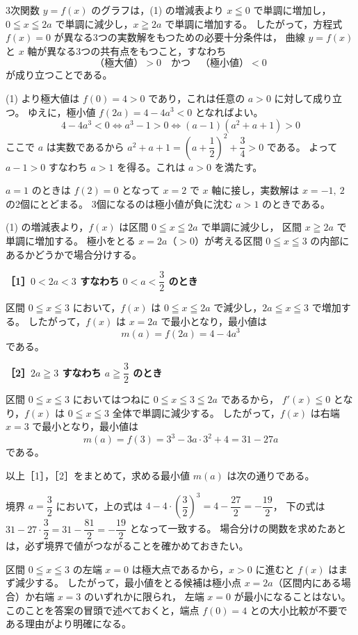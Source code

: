 3次関数 $y=f(x)$ のグラフは，(1) の増減表より $x\leqq0$ で単調に増加し，
$0\leqq x\leqq2a$ で単調に減少し，$x\geqq2a$ で単調に増加する。
したがって，方程式 $f(x)=0$ が異なる3つの実数解をもつための必要十分条件は，
曲線 $y=f(x)$ と $x$ 軸が異なる3つの共有点をもつこと，すなわち
\[
  \text{（極大値）}>0\quad\text{かつ}\quad\text{（極小値）}<0
\]
が成り立つことである。

(1) より極大値は $f(0)=4>0$ であり，これは任意の $a>0$ に対して成り立つ。
ゆえに，極小値 $f(2a)=4-4a^{3}<0$ となればよい。
\[
  4-4a^{3}<0 \iff a^{3}-1>0 \iff (a-1)(a^{2}+a+1)>0
\]
ここで $a$ は実数であるから $a^{2}+a+1=\left(a+\dfrac{1}{2}\right)^{2}+\dfrac{3}{4}>0$ である。
よって $a-1>0$ すなわち $a>1$ を得る。これは $a>0$ を満たす。


$a=1$ のときは $f(2)=0$ となって $x=2$ で $x$ 軸に接し，実数解は $x=-1,\ 2$ の2個にとどまる。
3個になるのは極小値が負に沈む $a>1$ のときである。

(1) の増減表より，$f(x)$ は区間 $0\leqq x\leqq2a$ で単調に減少し，
区間 $x\geqq2a$ で単調に増加する。
極小をとる $x=2a$（$>0$）が考える区間 $0\leqq x\leqq3$ の内部にあるかどうかで場合分けする。

\medskip
\noindent\textbf{［1］$0<2a<3$ すなわち $0<a<\dfrac{3}{2}$ のとき}

区間 $0\leqq x\leqq3$ において，$f(x)$ は $0\leqq x\leqq2a$ で減少し，$2a\leqq x\leqq3$ で増加する。
したがって，$f(x)$ は $x=2a$ で最小となり，最小値は
\[
  m(a)=f(2a)=4-4a^{3}
\]
である。

\medskip
\noindent\textbf{［2］$2a\geqq3$ すなわち $a\geqq\dfrac{3}{2}$ のとき}

区間 $0\leqq x\leqq3$ においてはつねに $0\leqq x\leqq3\leqq2a$ であるから，
$f'(x)\leqq0$ となり，$f(x)$ は $0\leqq x\leqq3$ 全体で単調に減少する。
したがって，$f(x)$ は右端 $x=3$ で最小となり，最小値は
\[
  m(a)=f(3)=3^{3}-3a\cdot3^{2}+4=31-27a
\]
である。

\medskip
以上［1］，［2］をまとめて，求める最小値 $m(a)$ は次の通りである。


境界 $a=\dfrac{3}{2}$ において，上の式は $4-4\cdot\left(\dfrac{3}{2}\right)^{3}=4-\dfrac{27}{2}=-\dfrac{19}{2}$，
下の式は $31-27\cdot\dfrac{3}{2}=31-\dfrac{81}{2}=-\dfrac{19}{2}$ となって一致する。
場合分けの関数を求めたあとは，必ず境界で値がつながることを確かめておきたい。

\begin{betsu}[グラフの位置関係による視覚的確認]
区間 $0\leqq x\leqq3$ の左端 $x=0$ は極大点であるから，$x>0$ に進むと $f(x)$ はまず減少する。
したがって，最小値をとる候補は極小点 $x=2a$（区間内にある場合）か右端 $x=3$ のいずれかに限られ，
左端 $x=0$ が最小になることはない。このことを答案の冒頭で述べておくと，端点 $f(0)=4$ との大小比較が不要である理由がより明確になる。
\end{betsu}


